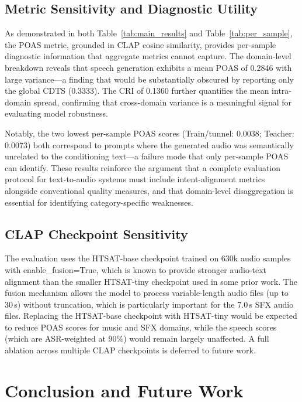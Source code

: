 \documentclass[journal]{IEEEtran}
\begin{document}
\subsection{Metric Sensitivity and Diagnostic Utility}

As demonstrated in both Table~\ref{tab:main_results} and
Table~\ref{tab:per_sample}, the POAS metric, grounded in CLAP cosine
similarity, provides per-sample diagnostic information that aggregate
metrics cannot capture. The domain-level breakdown reveals that speech
generation exhibits a mean POAS of 0.2846 with large variance---a
finding that would be substantially obscured by reporting only the
global CDTS (0.3333). The CRI of 0.1360 further quantifies the mean
intra-domain spread, confirming that cross-domain variance is a
meaningful signal for evaluating model robustness.

Notably, the two lowest per-sample POAS scores (Train/tunnel: 0.0038;
Teacher: 0.0073) both correspond to prompts where the generated audio
was semantically unrelated to the conditioning text---a failure mode
that only per-sample POAS can identify. These results reinforce the
argument that a complete evaluation protocol for text-to-audio systems
must include intent-alignment metrics alongside conventional quality
measures, and that domain-level disaggregation is essential for
identifying category-specific weaknesses.

\subsection{CLAP Checkpoint Sensitivity}

The evaluation uses the HTSAT-base checkpoint trained on 630k audio
samples with enable\_fusion=True, which is known to provide stronger
audio-text alignment than the smaller HTSAT-tiny checkpoint used in
some prior work. The fusion mechanism allows the model to process
variable-length audio files (up to 30\,s) without truncation, which
is particularly important for the 7.0\,s SFX audio files. Replacing
the HTSAT-base checkpoint with HTSAT-tiny would be expected to reduce
POAS scores for music and SFX domains, while the speech scores (which
are ASR-weighted at 90\%) would remain largely unaffected. A full
ablation across multiple CLAP checkpoints is deferred to future work.

\section{Conclusion and Future Work}
\label{sec:conclusion}
\end{document}
